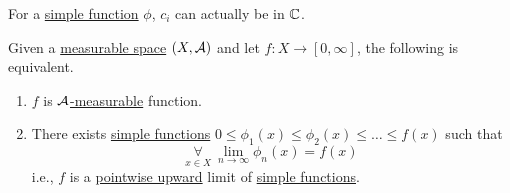 \begin{prev}
	For a \hyperref[def:simple-function]{simple function} \(\phi\), \(c_{i}\) can actually be in \(\mathbb{\MakeUppercase{c}} \).
\end{prev}

\begin{theorem}
	Given a \hyperref[def:measurable-space]{measurable space} \((X, \mathcal{\MakeUppercase{a}} )\) and let \(f\colon X\to [0, \infty ]\), the following is equivalent.
	\begin{enumerate}
		\item \(f\) is \hyperref[def:A-measurable-function]{\(\mathcal{\MakeUppercase{a}} \)-measurable} function.
		\item There exists \hyperref[def:simple-function]{simple functions} \(0\leq \phi_1(x)\leq \phi_2(x)\leq \ldots \leq f(x) \) such that
		      \[
			      \underset{x\in X}{\forall }\ \lim\limits_{n \to \infty} \phi _{n}(x) = f(x)
		      \]
		      i.e., \(f\) is a \underline{pointwise upward} limit of \hyperref[def:simple-function]{simple functions}.
	\end{enumerate}
\end{theorem}
